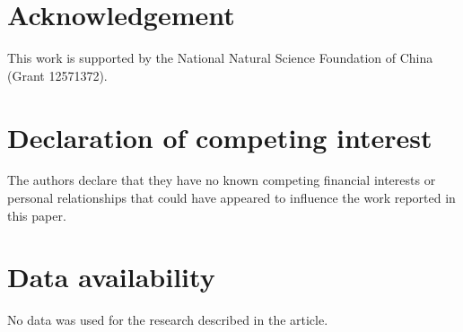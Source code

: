 \documentclass[12pt]{article}%
\begin{document}
\section*{Acknowledgement}
This work is supported by the National Natural Science Foundation of China (Grant 12571372).

\section*{Declaration of competing interest}
The authors declare that they have no known competing financial interests or personal relationships that could have appeared to influence the work reported in this paper.


\section*{Data availability}
No data was used for the research described in the article.
\end{document}
